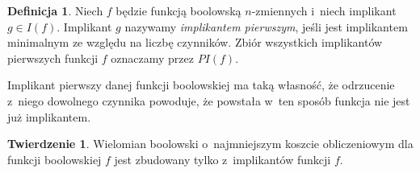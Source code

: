 \documentclass[a4paper,11pt,twoside]{article}
\theoremstyle{definition}
\newtheorem{df}{Definicja}
\newtheorem{tw}{Twierdzenie}
\begin{document}
\begin{df}
Niech $f$ będzie funkcją boolowską $n$-zmiennych i~niech implikant $g \in I(f)$.  Implikant $g$ nazywamy {\em implikantem pierwszym}, jeśli jest implikantem minimalnym ze względu na liczbę czynników. Zbiór wszystkich implikantów pierwszych funkcji $f$ oznaczamy przez $\mathit{PI}(f)$.
\end{df}
Implikant pierwszy danej funkcji boolowskiej ma taką własność, że odrzucenie z~niego dowolnego czynnika powoduje, że powstała w~ten sposób funkcja nie jest już implikantem.
\begin{tw}
Wielomian boolowski o~najmniejszym koszcie obliczeniowym dla funkcji boolowskiej $f$ jest zbudowany tylko z~implikantów funkcji $f$.
\end{tw}
\end{document}
